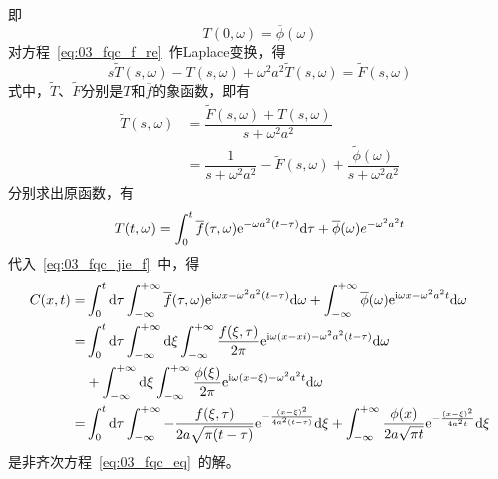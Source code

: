 即
\begin{equation}\label{eq:03_fqc_f_re_bj}
 T(0,\omega)=\overline{\phi}(\omega)
\end{equation}
对方程~\ref{eq:03_fqc_f_re}~作Laplace变换，得
\begin{equation*}
 s\widetilde{T}(s,\omega)-T(s,\omega)+\omega^2 a^2\widetilde{T}(s,\omega)=\widetilde{F}(s,\omega)
\end{equation*}
式中，$\widetilde{T}$、$\widetilde{F}$分别是$T$和$\overline{f}$的象函数，即有
\begin{equation*}
\begin{aligned}
 \widetilde{T}(s,\omega)&= \dfrac{\widetilde{F}(s,\omega)+T(s,\omega)}{s+\omega^2a^2} \\
                    &= \dfrac{1}{s+\omega^2 a^2}-\widetilde{F}(s,\omega)+\dfrac{\widetilde{\phi}(\omega)}{s+\omega^2 a^2}
\end{aligned}
\end{equation*}
分别求出原函数，有
\begin{equation*}
 T(t,\omega)=\int_0^t\overline{f}(\tau,\omega)\mathrm{e}^{-\omega a^2(t-\tau)}\mathrm{d}\tau+\overline{\phi}(\omega)e^{-\omega^2 a^2 t}
\end{equation*}
代入~\ref{eq:03_fqc_jie_f}~中，得
\begin{equation}
 \begin{split}
  C(x,t) =&\int_0^t\mathrm{d}\tau\int_{-\infty}^{+\infty}\overline{f}(\tau,\omega)\mathrm{e}^{\mathrm{i}\omega x-\omega^2 a^2(t-\tau)}\mathrm{d}\omega
         +\int_{-\infty}^{+\infty}\overline{\phi}(\omega)\mathrm{e}^{\mathrm{i}\omega x-\omega^2 a^2 t}\mathrm{d}\omega\\
         =&\int_0^t\mathrm{d}\tau\int_{-\infty}^{+\infty}\mathrm{d}\xi\int_{-\infty}^{+\infty}\dfrac{f(\xi,\tau)}{2\pi}\mathrm{e}^{\mathrm{i}\omega(x-xi)-\omega^2 a^2(t-\tau)}\mathrm{d}\omega
         \\&+\int_{-\infty}^{+\infty}\mathrm{d}\xi\int_{-\infty}^{+\infty}\dfrac{\phi(\xi)}{2\pi}\mathrm{e}^{\mathrm{i}\omega(x-\xi)-\omega^2 a^2 t}\mathrm{d}\omega\\
         =&\int_0^t\mathrm{d}\tau\int_{-\infty}^{+\infty}-\dfrac{f(\xi,\tau)}{2a\sqrt{\pi(t-\tau)}}\mathrm{e}^{-\frac{(x-\xi)^2}{4a^2(t-\tau)}}\mathrm{d}\xi
         +\int_{-\infty}^{+\infty}\frac{\phi(x)}{2a\sqrt{\pi t}}\mathrm{e}^{-\frac{(x-\xi)^2}{4a^2 t}}\mathrm{d}\xi
 \end{split}
\end{equation}
是非齐次方程~\ref{eq:03_fqc_eq}~的解。

